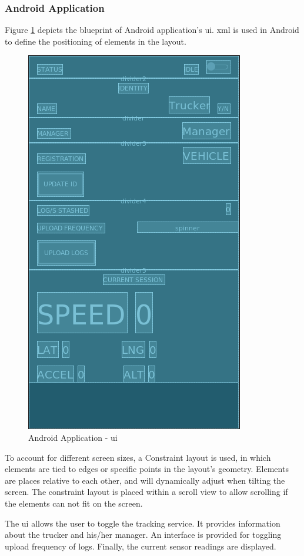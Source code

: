 \subsubsection{Android Application}
Figure \ref{fig:android_ui} depicts the blueprint of Android application's \ac{ui}.
\Ac{xml} is used in Android to define the positioning of elements in the layout.
\begin{figure}[H]
\centering
\includegraphics[scale=0.65]{android_ui.png}
\caption{Android Application - \ac{ui}}
\label{fig:android_ui}
\end{figure}

To account for different screen sizes, a Constraint layout is used, in which elements are tied to edges or specific points in the layout's geometry.
Elements are places relative to each other, and will dynamically adjust when tilting the screen.
The constraint layout is placed within a scroll view to allow scrolling if the elements can not fit on the screen.

The \ac{ui} allows the user to toggle the tracking service.
It provides information about the trucker and his/her manager.
An interface is provided for toggling upload frequency of logs.
Finally, the current sensor readings are displayed.

